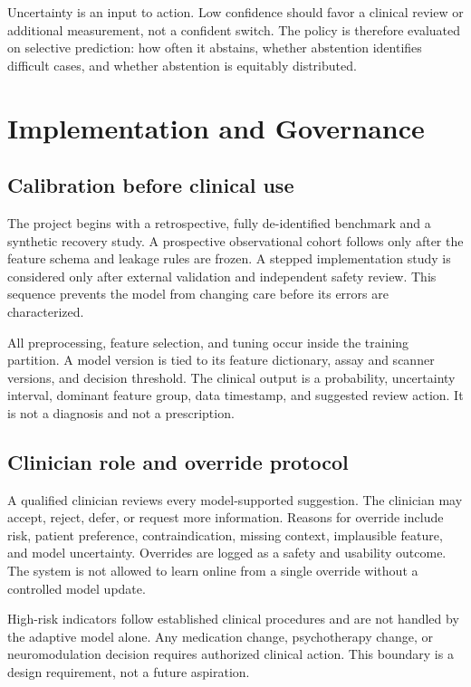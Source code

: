 \documentclass[conference]{IEEEtran}
\begin{document}
Uncertainty is an input to action. Low confidence should favor a clinical review or additional measurement, not a confident switch. The policy is therefore evaluated on selective prediction: how often it abstains, whether abstention identifies difficult cases, and whether abstention is equitably distributed.

\section{Implementation and Governance}
\subsection{Calibration before clinical use}
The project begins with a retrospective, fully de-identified benchmark and a synthetic recovery study. A prospective observational cohort follows only after the feature schema and leakage rules are frozen. A stepped implementation study is considered only after external validation and independent safety review. This sequence prevents the model from changing care before its errors are characterized.

All preprocessing, feature selection, and tuning occur inside the training partition. A model version is tied to its feature dictionary, assay and scanner versions, and decision threshold. The clinical output is a probability, uncertainty interval, dominant feature group, data timestamp, and suggested review action. It is not a diagnosis and not a prescription.

\subsection{Clinician role and override protocol}
A qualified clinician reviews every model-supported suggestion. The clinician may accept, reject, defer, or request more information. Reasons for override include risk, patient preference, contraindication, missing context, implausible feature, and model uncertainty. Overrides are logged as a safety and usability outcome. The system is not allowed to learn online from a single override without a controlled model update.

High-risk indicators follow established clinical procedures and are not handled by the adaptive model alone. Any medication change, psychotherapy change, or neuromodulation decision requires authorized clinical action. This boundary is a design requirement, not a future aspiration.
\end{document}
